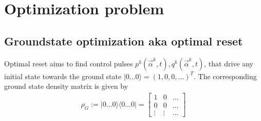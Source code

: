 \documentclass[letterpaper]{article}
\begin{document}
\section{Optimization problem}

\subsection{Groundstate optimization aka optimal
reset}\label{sec:groundstate-obj}
Optimal reset aims to find control pulses $p^k(\vec{\alpha}^k, t), q^k(\vec{\alpha}^k, t)$,
that drive any initial state towards the ground state $|0\dots 0\rangle = (1, 0,
0, \dots )^T$. The corresponding ground state density matrix is given by
\begin{align}
  \rho_{G} := |0\dots 0\rangle \langle 0 \dots 0 | = 
  \begin{bmatrix} 1      & 0      &  \dots   \\ 
                  0      & 0      &  \dots  \\ 
                  \vdots & \vdots &  \dots 
  \end{bmatrix}
\end{align}
\end{document}
